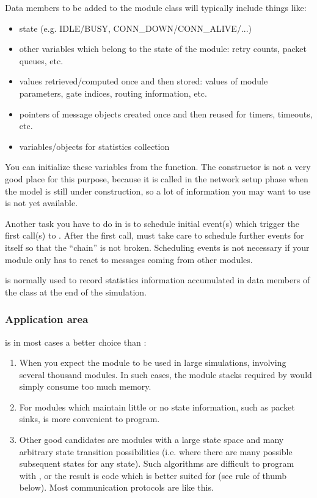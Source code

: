 Data members to be added to the module class will typically include
things like:

\begin{itemize}
  \item{state (e.g. IDLE/BUSY, CONN\_DOWN/CONN\_ALIVE/...)}
  \item{other variables which belong to the state of the module: retry
    counts, packet queues, etc.}
  \item{values retrieved/computed once and then stored: values of module
    parameters, gate indices, routing information, etc.}
  \item{pointers of message objects created once and then reused for
    timers, timeouts, etc.}
  \item{variables/objects for statistics collection}
\end{itemize}

You can initialize these variables from the 
function.  The constructor is not a very good place
for this purpose, because it is called in the network setup phase when
the model is still under construction, so a lot of information you may
want to use is not yet available.

Another task you have to do in  is to schedule
initial event(s) which trigger the first call(s)
to .  After the first call,
 must take care to schedule further events for
itself so that the ``chain'' is not broken. Scheduling events is not
necessary if your module only has to react to messages coming from
other modules.

 is normally used to record statistics information
accumulated in data members of the class at the end of the simulation.


\subsubsection{Application area}


 is in most cases a better choice than :

\begin{enumerate}
  \item{When you expect the module to be used in large simulations,
      involving several thousand modules. In such cases, the module stacks
      required by  would simply consume too much memory.}
  \item{For modules which maintain little or no state information,
      such as packet sinks,  is more convenient to program.}
  \item{Other good candidates are modules with a large state space and
      many arbitrary state transition possibilities (i.e. where there
      are many possible subsequent states for any state). Such algorithms
      are difficult to program with , or the result is code
      which is better suited for  (see rule of thumb
      below). Most communication protocols are like this.}
\end{enumerate}


